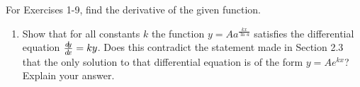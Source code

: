 \divider
\vspace{3mm}
\startexercises\label{sec2dot4}
{\small
{}
\par\noindent For Exercises 1-9, find the derivative of the given function.
\begin{enumerate}[\bfseries 1.]
[{[\bfseries 1.]}]
 \item Show that for all constants $k$ the function $y = A a^{\frac{kx}{\ln\,a}}$
  satisfies the differential equation $\frac{d\negmedspace y}{d\!x} = ky$. Does this contradict the
  statement made in Section 2.3 that the only solution to that differential
  equation is of the form $y = A e^{kx}$? Explain your answer.
\end{enumerate}}
